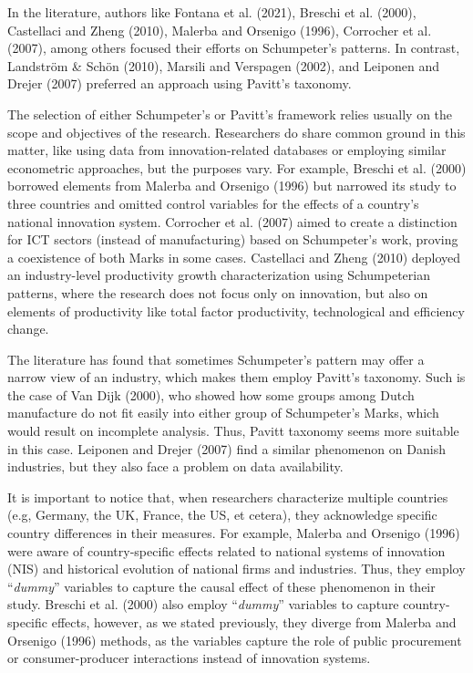 \documentclass[12pt,a4paper]{article}
\begin{document}
In the literature, authors like Fontana et al. (2021), Breschi et al. (2000), Castellaci and Zheng (2010), Malerba and Orsenigo (1996), Corrocher et al. (2007), among others focused their efforts on Schumpeter's patterns. In contrast, Landström \& Schön (2010), Marsili and Verspagen (2002), and Leiponen and Drejer (2007) preferred an approach using Pavitt's taxonomy. 

The selection of either Schumpeter’s or Pavitt’s framework relies usually on the scope and objectives of the research. Researchers do share common ground in this matter, like using data from innovation-related databases or employing similar econometric approaches, but the purposes vary. For example, Breschi et al. (2000) borrowed elements from Malerba and Orsenigo (1996) but narrowed its study to three countries and omitted control variables for the effects of a country's national innovation system. Corrocher et al. (2007) aimed to create a distinction for ICT sectors (instead of manufacturing) based on Schumpeter’s work, proving a coexistence of both Marks in some cases. Castellaci and Zheng (2010) deployed an industry-level productivity growth characterization using Schumpeterian patterns, where the research does not focus only on innovation, but also on elements of productivity like total factor productivity, technological and efficiency change. 

The literature has found that sometimes Schumpeter’s pattern may offer a narrow view of an industry, which makes them employ Pavitt’s taxonomy. Such is the case of Van Dijk (2000), who showed how some groups among Dutch manufacture do not fit easily into either group of Schumpeter’s Marks, which would result on incomplete analysis. Thus, Pavitt taxonomy seems more suitable in this case. Leiponen and Drejer (2007) find a similar phenomenon on Danish industries, but they also face a problem on data availability. 

It is important to notice that, when researchers characterize multiple countries (e.g, Germany, the UK, France, the US, et cetera), they acknowledge specific country differences in their measures. For example, Malerba and Orsenigo (1996) were aware of country-specific effects related to national systems of innovation (NIS) and historical evolution of national firms and industries. Thus, they employ “\textit{dummy}” variables to capture the causal effect of these phenomenon in their study. Breschi et al. (2000) also employ “\textit{dummy}” variables to capture country-specific effects, however, as we stated previously, they diverge from Malerba and Orsenigo (1996) methods, as the variables capture the role of public procurement or consumer-producer interactions instead of innovation systems. 
\end{document}
